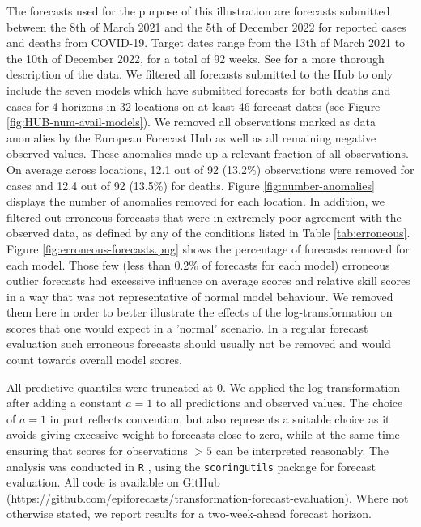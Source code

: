\documentclass{article}
\begin{document}
The forecasts used for the purpose of this illustration are forecasts submitted between the 8th of March 2021 and the 5th of December 2022 for reported cases and deaths from COVID-19. Target dates range from the 13th of March 2021 to the 10th of December 2022, for a total of 92 weeks. See \cite{sherrattPredictivePerformanceMultimodel2022} for a more thorough description of the data. We filtered all forecasts submitted to the Hub to only include the seven models which have submitted forecasts for both deaths and cases for 4 horizons in 32 locations on at least 46 forecast dates (see Figure \ref{fig:HUB-num-avail-models}). We removed all observations marked as data anomalies by the European Forecast Hub \citep{sherrattPredictivePerformanceMultimodel2022} as well as all remaining negative observed values. These anomalies made up a relevant fraction of all observations. On average across locations, 12.1 out of 92 (13.2\%) observations were removed for cases and 12.4 out of 92 (13.5\%) for deaths. Figure \ref{fig:number-anomalies} displays the number of anomalies removed for each location. In addition, we filtered out erroneous forecasts that were in extremely poor agreement with the observed data, as defined by any of the conditions listed in Table \ref{tab:erroneous}. Figure \ref{fig:erroneous-forecasts.png} shows the percentage of forecasts removed for each model. Those few (less than 0.2\%  of forecasts for each model) erroneous outlier forecasts had excessive influence on average scores and relative skill scores in a way that was not representative of normal model behaviour. We removed them here in order to better illustrate the effects of the log-transformation on scores that one would expect in a 'normal' scenario. In a regular forecast evaluation such erroneous forecasts should usually not be removed and would count towards overall model scores. 

All predictive quantiles were truncated at 0. We applied the log-transformation after adding a constant $a = 1$ to all predictions and observed values. The choice of $a = 1$ in part reflects convention, but also represents a suitable choice as it avoids giving excessive weight to forecasts close to zero, while at the same time ensuring that scores for observations $> 5$ can be interpreted reasonably. The analysis was conducted in \texttt{R} \citep{R}, using the \texttt{scoringutils} package \citep{bosseEvaluatingForecastsScoringutils2022} for forecast evaluation. All code is available on GitHub 
(\url{https://github.com/epiforecasts/transformation-forecast-evaluation}). Where not otherwise stated, we report results for a two-week-ahead forecast horizon. 
\end{document}
